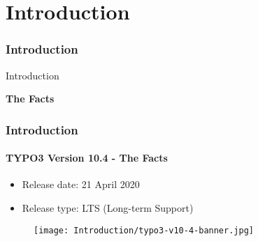 %

\section{Introduction}
\begin{frame}[fragile]
	\frametitle{Introduction}

	\begin{center}\huge{Introduction}\end{center}
	\begin{center}\huge{\color{typo3darkgrey}\textbf{The Facts}}\end{center}

\end{frame}


\begin{frame}[fragile]
	\frametitle{Introduction}
	\framesubtitle{TYPO3 Version 10.4 - The Facts}

	\begin{itemize}
		\item Release date: 21 April 2020
		\item Release type: LTS (Long-term Support)
	\end{itemize}

	\begin{figure}
		\texttt{[image: Introduction/typo3-v10-4-banner.jpg]}
	\end{figure}

\end{frame}


